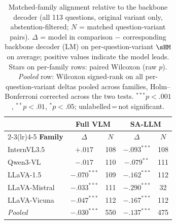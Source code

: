 \begin{table}[ht]
\centering\small\setlength{\tabcolsep}{5pt}
\begin{tabular}{l cc cc}
\toprule
& \multicolumn{2}{c}{\textbf{Full VLM}} & \multicolumn{2}{c}{\textbf{SA-LLM}} \\
\cmidrule(lr){2-3}\cmidrule(lr){4-5}
\textbf{Family} & $\Delta$ & $N$ & $\Delta$ & $N$ \\
\midrule
InternVL3.5 & $+.017$ & 108 & $-.093^{***}$ & 108 \\
Qwen3-VL & $-.017$ & 110 & $-.079^{**}$ & 111 \\
LLaVA-1.5 & $-.070^{***}$ & 109 & $-.162^{***}$ & 112 \\
LLaVA-Mistral & $-.033^{***}$ & 111 & $-.290^{***}$ & 32 \\
LLaVA-Vicuna & $-.047^{***}$ & 112 & $-.167^{***}$ & 112 \\
\midrule
\textit{Pooled} & $-.030^{***}$ & 550 & $-.137^{***}$ & 475 \\
\bottomrule
\end{tabular}
\caption{Matched-family alignment relative to the backbone decoder (all 113 questions, original variant only, abstention-filtered; $N$ = matched question-variant pairs).
$\Delta$ = model in comparison $-$ corresponding backbone decoder (LM) on per-question-variant $\sHM$ on average; positive values indicate the model leads.
Stars on per-family rows: paired Wilcoxon (raw $p$). \textit{Pooled} row: Wilcoxon signed-rank on all per-question-variant deltas pooled across families, Holm--Bonferroni corrected across the two tests. ${}^{***}p{<}.001$, ${}^{**}p{<}.01$, ${}^{*}p{<}.05$; unlabelled\,=\,not significant.}
\label{tab:matched_family_alignment_tests_orig_absf}
\end{table}